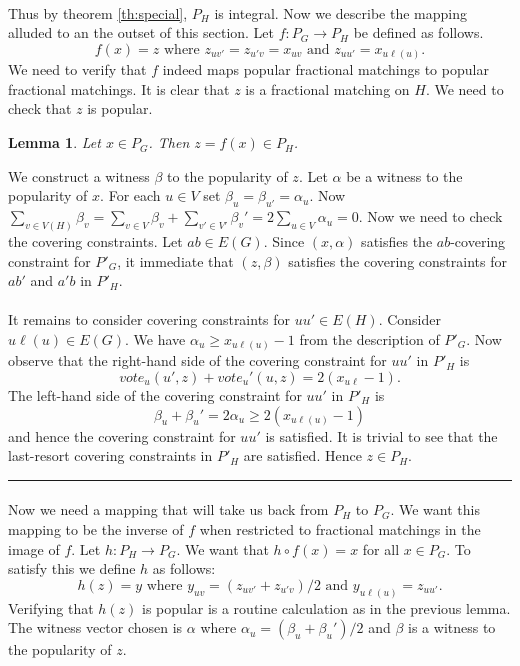 \documentclass[letterpaper,12pt,oneside,onecolumn]{article}
\newenvironment{proof}{{\bf Proof:  }}{\hfill\rule{2mm}{2mm}}
\newtheorem{lemma}[fact]{Lemma}
\begin{document}
\paragraph{}
Thus by theorem \ref{th:special}, $P_H$ is integral. Now we describe the mapping alluded to an the outset of this section. Let $f: P_G \rightarrow P_H$ be defined as follows.
$$f(x) = z \text{ where } z_{uv'}=z_{u'v} =x_{uv} \text{ and } z_{uu'} = x_{u\ell(u)}.$$
We need to verify that $f$ indeed maps popular fractional matchings to popular fractional matchings. It is clear that $z$ is a fractional matching on $H$. We need to check that $z$ is popular.
\begin{lemma}
Let $x \in P_G$. Then $z = f(x) \in P_H$.
\end{lemma}
\begin{proof}
We construct a witness $\beta$ to the popularity of $z$. Let $\alpha$ be a witness to the popularity of $x$. For each $u \in V$ set $\beta_u = \beta_{u'} = \alpha_u$. Now $\sum_{v\in V(H)} \beta_v = \sum_{v \in V} \beta_v + \sum_{v' \in V'} \beta_v' = 2 \sum_{u \in V} \alpha_u = 0$. Now we need to check the covering constraints. Let $ab \in E(G)$. Since $(x,\alpha)$ satisfies the $ab$-covering constraint for $P'_G$, it immediate that $(z,\beta)$ satisfies the covering constraints for $ab'$ and $a'b$ in $P'_H$.
\paragraph{}
It remains to consider covering constraints for $uu' \in E(H)$. Consider $u\ell(u) \in E(G)$. We have $\alpha_u \geq x_{u\ell(u)} - 1$ from the description of $P'_G$. Now observe that the right-hand side of the covering constraint for $uu'$ in $P'_H$ is
$$vote_u(u', z) + vote_u'(u,z) = 2(x_{u\ell}-1).$$
The left-hand side of the covering constraint for $uu'$ in $P'_H$ is
$$\beta_u + \beta_u' = 2\alpha_u \geq 2(x_{u\ell(u)}-1)$$
and hence the covering constraint for $uu'$ is satisfied. It is trivial to see that the last-resort covering constraints in $P'_H$ are satisfied. Hence $z \in P_H$.
\end{proof}
\paragraph{}
Now we need a mapping that will take us back from $P_H$ to $P_G$. We want this mapping to be the inverse of $f$ when restricted to fractional matchings in the image of $f$. Let $h: P_H \rightarrow P_G$. We want that $h \circ f (x) = x$ for all $x \in P_G$. To satisfy this we define $h$ as follows:
$$h(z) = y \text{ where } y_{uv} = (z_{uv'} + z_{u'v})/2 \text{ and } y_{u\ell(u)} = z_{uu'}.$$
Verifying that $h(z)$ is popular is a routine calculation as in the previous lemma. The witness vector chosen is  $\alpha$ where $\alpha_u = (\beta_u + \beta_u')/2$ and $\beta$ is a witness to the popularity of $z$.
\end{document}

